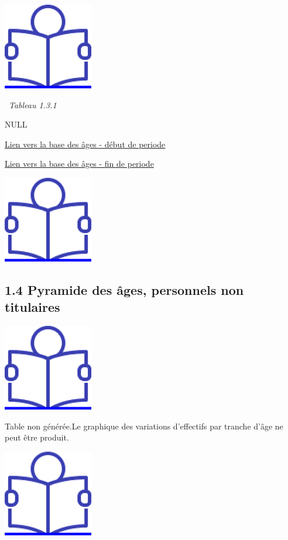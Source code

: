 \href{../Docs/Notices/fiche_3.odt}{\includegraphics{icones/Notice.png}}

\newpage

~\emph{Tableau 1.3.1}

NULL

\href{../Bases/Effectifs/Pyramide-des-ages-des-fonctionnaires_2009.csv}{Lien
vers la base des âges - début de periode}

\href{../Bases/Effectifs/Pyramide-des-ages-des-fonctionnaires_2013.csv}{Lien
vers la base des âges - fin de periode}

\href{../Docs/Notices/fiche_1.odt}{\includegraphics{icones/Notice.png}}

\hypertarget{pyramide-des-ages-personnels-non-titulaires}{%
\subsection{1.4 Pyramide des âges, personnels non titulaires
~}\label{pyramide-des-ages-personnels-non-titulaires}}

\href{../Docs/Notices/fiche_2.odt}{\includegraphics{icones/Notice.png}}

Table non générée.\newpage Le graphique des variations d'effectifs par
tranche d'âge ne peut être produit.

\href{../Docs/Notices/fiche_3.odt}{\includegraphics{icones/Notice.png}}


